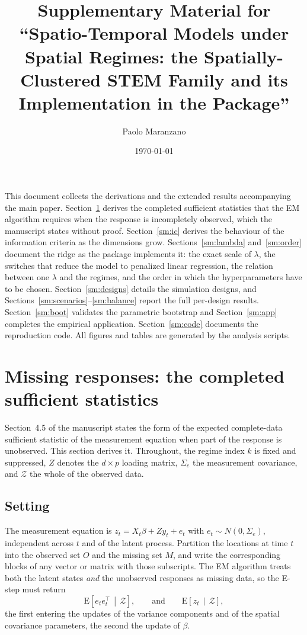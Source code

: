 \documentclass[11pt]{article}
\title{Supplementary Material for\\
       ``Spatio-Temporal Models under Spatial Regimes: the Spatially-Clustered
       STEM Family and its Implementation in the \Stem{} \Rlang{} Package''}
\author{Paolo Maranzano}
\date{\today}
\begin{document}
\maketitle

\noindent This document collects the derivations and the extended results accompanying the main paper. Section~\ref{sm:missing} derives the completed sufficient statistics that the EM algorithm requires when the response is incompletely observed, which the manuscript states without proof. Section~\ref{sm:ic} derives the behaviour of the information criteria as the dimensions grow. Sections~\ref{sm:lambda} and~\ref{sm:order} document the ridge as the package implements it: the exact scale of $\lambda$, the switches that reduce the model to penalized linear regression, the relation between one $\lambda$ and the regimes, and the order in which the hyperparameters have to be chosen. Section~\ref{sm:designs} details the simulation designs, and Sections~\ref{sm:scenarios}--\ref{sm:balance} report the full per-design results. Section~\ref{sm:boot} validates the parametric bootstrap and Section~\ref{sm:app} completes the empirical application. Section~\ref{sm:code} documents the reproduction code. All figures and tables are generated by the analysis scripts.

\section{Missing responses: the completed sufficient statistics}\label{sm:missing}

Section~4.5 of the manuscript states the form of the expected complete-data sufficient statistic of the measurement equation when part of the response is unobserved. This section derives it. Throughout, the regime index $k$ is fixed and suppressed, $Z$ denotes the $d \times p$ loading matrix, $\Sigma_e$ the measurement covariance, and $\mathcal{Z}$ the whole of the observed data.

\subsection{Setting}

The measurement equation is $z_t = X_t \beta + Z y_t + e_t$ with $e_t \sim N(0, \Sigma_e)$, independent across $t$ and of the latent process. Partition the locations at time $t$ into the observed set $O$ and the missing set $M$, and write the corresponding blocks of any vector or matrix with those subscripts. The EM algorithm treats both the latent states \emph{and} the unobserved responses as missing data, so the E-step must return
\begin{equation}\label{eq:sm:target}
  \mathrm{E}\!\left[e_t e_t^\top \,\middle|\, \mathcal{Z}\right],
  \qquad\text{and}\qquad
  \mathrm{E}\!\left[z_t \,\middle|\, \mathcal{Z}\right],
\end{equation}
the first entering the updates of the variance components and of the spatial covariance parameters, the second the update of $\beta$.
\end{document}
